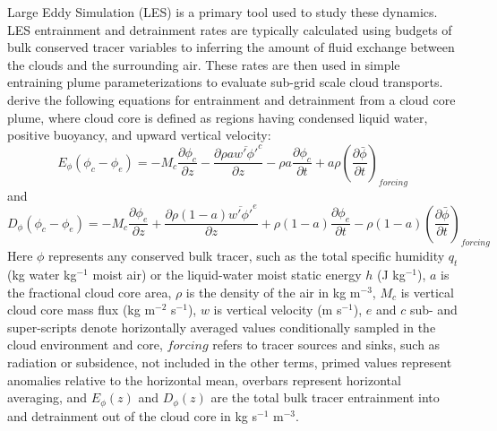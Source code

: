 \documentclass[12pt]{article}
\begin{document}
Large Eddy Simulation (LES) is a primary tool used to study these dynamics.  
LES entrainment and detrainment rates are typically calculated using budgets of 
bulk conserved tracer variables to inferring the amount of fluid exchange 
between the clouds and the surrounding air.  These rates are then used in 
simple entraining plume parameterizations to evaluate sub-grid scale cloud 
transports.  \cite{Siebesma1995} derive the following equations for 
entrainment and detrainment from a cloud core plume, where cloud core is 
defined as regions having condensed liquid water, positive buoyancy, and upward 
vertical velocity:
\begin{equation}
  \label{eq:siebesma_entrainment}
    E_{\phi}(\phi_c - \phi_e) = - M_c \frac{\partial \phi_c}{\partial z}
        - \frac{\partial \rho a \overline{w' \phi'}^c}{\partial z}
        - \rho a \frac{\partial \phi_c}{\partial t}
        + a \rho \left(\frac{\partial \bar{\phi}}{\partial t}\right)_{forcing}
\end{equation}
and
\begin{equation}
  \label{eq:siebesma_detrainment}
    D_{\phi}(\phi_c - \phi_e) = - M_c \frac{\partial \phi_e}{\partial z}
        + \frac{\partial \rho (1 - a) \overline{w' \phi'}^e}{\partial z}
        + \rho (1-a) \frac{\partial \phi_e}{\partial t}
     - \rho (1-a) \left(\frac{\partial \bar{\phi}}{\partial t}\right)_{forcing}
\end{equation}
Here $\phi$ represents any conserved bulk tracer, such as the total specific 
humidity $q_t$ (kg water kg$^{-1}$ moist air) or the liquid-water moist static 
energy $h$ (J kg$^{-1}$), $a$ is the fractional cloud core area, $\rho$ is the 
density of the air in kg m$^{-3}$, $M_c$ is vertical cloud core mass flux 
(kg m$^{-2}$ s$^{-1}$), $w$ is vertical velocity (m s$^{-1}$), $e$ and $c$ sub- 
and super-scripts denote horizontally averaged values conditionally sampled in 
the cloud environment and core, $forcing$ refers to tracer sources and sinks,
such as radiation or subsidence, not included in the other terms, primed values 
represent anomalies relative to the horizontal mean, overbars represent 
horizontal averaging, and $E_{\phi}(z)$ and $D_{\phi}(z)$ are the total bulk 
tracer entrainment into and detrainment out of the cloud core in 
kg s$^{-1}$ m$^{-3}$.  
\end{document}
